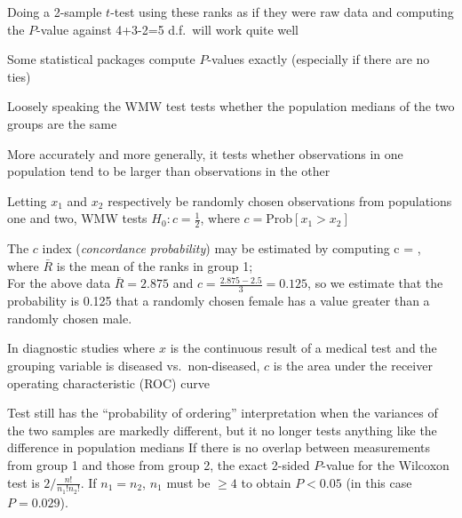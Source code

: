 \item Doing a 2-sample $t$-test using these ranks as if they were raw
  data and computing the $P$-value against 4+3-2=5 d.f.\ will work
  quite well
\item Some statistical packages compute $P$-values exactly (especially
  if there are no ties)
\item Loosely speaking the WMW test tests whether the population
  medians of the two groups are the same
\item More accurately and more generally, it tests whether
  observations in one population tend to be larger than observations
  in the other
\item Letting $x_1$ and $x_2$ respectively be randomly chosen
  observations from populations one and two, WMW tests
  $H_{0}:c=\frac{1}{2}$, where $c=$Prob$[x_{1} > x_{2}]$
\item The $c$ index (\emph{concordance probability}) may be estimated
  by computing
\beq
c = ,
\eeq
where $\bar{R}$ is the mean of the ranks in group 1; \\
For the above data $\bar{R} = 2.875$ and
$c=\frac{2.875-2.5}{3}=0.125$, so we estimate that the probability is
0.125 that a randomly chosen female has a value greater than a randomly
chosen male.
\item In diagnostic studies where $x$ is the continuous result of a
  medical test and the grouping variable is diseased vs.\ non-diseased,
  $c$ is the area under the receiver operating characteristic (ROC) curve
\item Test still has the ``probability of ordering'' interpretation
  when the variances of the two samples are markedly different, but it
  no longer tests anything like the difference in population medians
\ei
If there is no overlap between measurements from group 1 and those
from group 2, the exact 2-sided $P$-value for the Wilcoxon test is $2
/ \frac{n!}{n_{1}! n_{2}!}$.  If $n_{1}=n_{2}$, $n_{1}$ must be $\geq
4$ to obtain $P < 0.05$ (in this case $P = 0.029$). 

